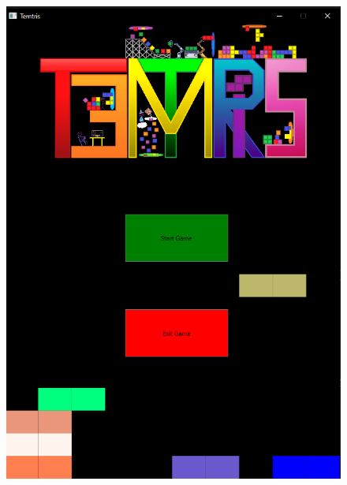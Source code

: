 \documentclass[10pt,conference,onecolumn,compsoc]{IEEEtran}
\begin{document}
\begin{figure}[h!]
\includegraphics[scale=0.3]{MainMenu.png}

\end{figure}
\end{document}
